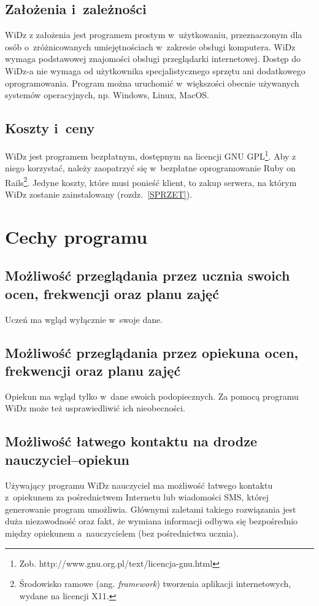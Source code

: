 \documentclass[12pt,leqno,twoside]{mwart}
\begin{document}
\subsection{Założenia i~zależności}
\noindent WiDz z założenia jest programem prostym w~użytkowaniu, przeznaczonym dla osób o~zróżnicowanych umiejętnościach w~zakresie obsługi komputera. WiDz wymaga podstawowej znajomości obsługi przeglądarki internetowej. Dostęp do WiDz-a nie wymaga od użytkownika specjalistycznego sprzętu ani dodatkowego oprogramowania. Program można uruchomić w~większości obecnie używanych systemów operacyjnych, np. Windows, Linux, MacOS.
\subsection{Koszty i~ceny}
\noindent WiDz jest programem bezpłatnym, dostępnym na licencji GNU GPL\footnote{Zob. http://www.gnu.org.pl/text/licencja-gnu.html}. Aby z niego korzystać, należy zaopatrzyć się w~bezpłatne oprogramowanie Ruby on Rails\footnote{Środowisko ramowe (ang. \textit{framework}) tworzenia aplikacji internetowych, wydane na licencji X11.}. Jedyne koszty, które musi ponieść klient, to zakup serwera, na którym WiDz zostanie zainstalowany (rozdz.~\ref{SPRZET}).

\section{Cechy programu}
\subsection{Możliwość przeglądania przez ucznia swoich ocen, frekwencji oraz planu zajęć}
\noindent Uczeń ma wgląd wyłącznie w~swoje dane.\\
\subsection{Możliwość przeglądania przez opiekuna ocen, frekwencji oraz planu zajęć}
\noindent Opiekun ma wgląd tylko w~dane swoich podopiecznych. Za pomocą programu WiDz może też usprawiedliwić ich nieobecności.\\
\subsection{Możliwość łatwego kontaktu na drodze nauczyciel--opiekun}
\noindent Używający programu WiDz nauczyciel ma możliwość łatwego kontaktu z~opiekunem za pośrednictwem Internetu lub wiadomości SMS, której generowanie program umożliwia. Głównymi zaletami takiego rozwiązania jest duża niezawodność oraz fakt, że wymiana informacji odbywa się bezpośrednio między opiekunem a~nauczycielem (bez pośrednictwa ucznia).
\end{document}
